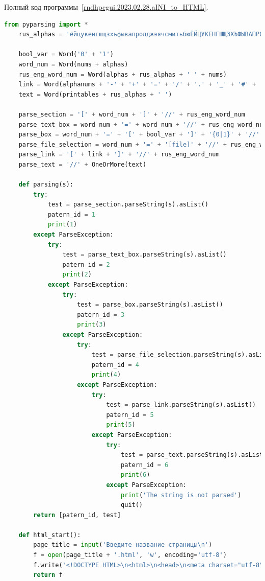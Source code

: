 Полный код программы~\ref{rndhpcgui.2023.02.28.aINI_to_HTML}.
\begin{lstlisting}[frame=single, label={rndhpcgui.2023.02.28.aINI_to_HTML}, caption={Пример выходных данных}, language={Python}]
    from pyparsing import *
    rus_alphas = 'ёйцукенгшщзхъфывапролджэячсмитьбюЁЙЦУКЕНГШЩЗХЪФЫВАПРОЛДЖЭЯЧСМИТЬБЮ'
    
    bool_var = Word('0' + '1')
    word_num = Word(nums + alphas)
    rus_eng_word_num = Word(alphas + rus_alphas + ' ' + nums)
    link = Word(alphanums + '-' + '+' + '=' + '/' + '.' + '_' + '#' + ':' + '&' + '?' + '%')
    text = Word(printables + rus_alphas + ' ')
    
    parse_section = '[' + word_num + ']' + '//' + rus_eng_word_num
    parse_text_box = word_num + '=' + word_num + '//' + rus_eng_word_num
    parse_box = word_num + '=' + '[' + bool_var + ']' + '{0|1}' + '//' + rus_eng_word_num
    parse_file_selection = word_num + '=' + '[file]' + '//' + rus_eng_word_num
    parse_link = '[' + link + ']' + '//' + rus_eng_word_num
    parse_text = '//' + OneOrMore(text)
    
    def parsing(s):
        try:
            test = parse_section.parseString(s).asList()
            patern_id = 1
            print(1)
        except ParseException:
            try:
                test = parse_text_box.parseString(s).asList()
                patern_id = 2
                print(2)
            except ParseException:
                try:
                    test = parse_box.parseString(s).asList()
                    patern_id = 3
                    print(3)
                except ParseException:
                    try:
                        test = parse_file_selection.parseString(s).asList()
                        patern_id = 4
                        print(4)
                    except ParseException:
                        try:
                            test = parse_link.parseString(s).asList()
                            patern_id = 5
                            print(5)
                        except ParseException:
                            try:
                                test = parse_text.parseString(s).asList()
                                patern_id = 6
                                print(6)
                            except ParseException:
                                print('The string is not parsed')
                                quit()
        return [patern_id, test]
    
    def html_start():
        page_title = input('Введите название страницы\n')
        f = open(page_title + '.html', 'w', encoding='utf-8')
        f.write('<!DOCTYPE HTML>\n<html>\n<head>\n<meta charset="utf-8">\n<title>'+page_title+'</title>\n<style>\np.text {text-indent: 20px;}\n</style>\n</head>\n<body>\n<form enctype="multipart/form-data" method="post">\n')
        return f
    

\end{lstlisting}
